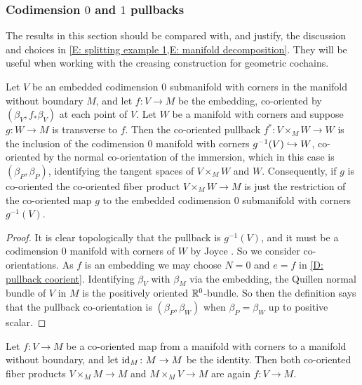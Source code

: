 \subsubsection{Codimension $0$ and $1$ pullbacks}\label{S: codim 0 and 1 co-or}

The results in this section should be compared with, and justify, the discussion and choices in \cref{E: splitting example 1,E: manifold decomposition}.
They will be useful when working with the creasing construction for geometric cochains.

\begin{proposition}\label{P: codim 0 pullback}
	Let $V$ be an embedded codimension $0$ submanifold with corners in the manifold without boundary $M$, and let $f \colon V \to M$ be the embedding, co-oriented by $(\beta_V, f_*\beta_V)$ at each point of $V$.
	Let $W$ be a manifold with corners and suppose $g \colon W \to M$ is transverse to $f$.
	Then the co-oriented pullback $f^* \colon V \times_M W \to W$ is the inclusion of the codimension $0$ manifold with corners $g^{-1}(V) \hookrightarrow W$, co-oriented by the normal co-orientation of the immersion, which in this case is $(\beta_P, \beta_P)$, identifying the tangent spaces of $V \times_M W$ and $W$.
	Consequently, if $g$ is co-oriented the co-oriented fiber product $V \times_M W \to M$ is just the restriction of the co-oriented map $g$ to the embedded codimension $0$ submanifold with corners $g^{-1}(V)$.
\end{proposition}

\begin{proof}
	It is clear topologically that the pullback is $g^{-1}(V)$, and it must be a codimension $0$ manifold with corners of $W$ by Joyce \cite{Joy12}.
	So we consider co-orientations.
	As $f$ is an embedding we may choose $N = 0$ and $e = f$ in \cref{D: pullback coorient}.
	Identifying $\beta_V$ with $\beta_M$ via the embedding, the Quillen normal bundle of $V$ in $M$ is the positively oriented $\mathbb{R}^0$-bundle.
	So then the definition says that the pullback co-orientation is $(\beta_P, \beta_W)$ when $\beta_P = \beta_W$ up to positive scalar.
\end{proof}

\begin{corollary}\label{C: cup with identity}
	Let $f \colon V \to M$ be a co-oriented map from a manifold with corners to a manifold without boundary, and let $\mathrm{id}_M \colon M \to M$ be the identity.
	Then both co-oriented fiber products $V \times_M M \to M$ and $M \times_M V \to M$ are again $f \colon V \to M$.
\end{corollary}

